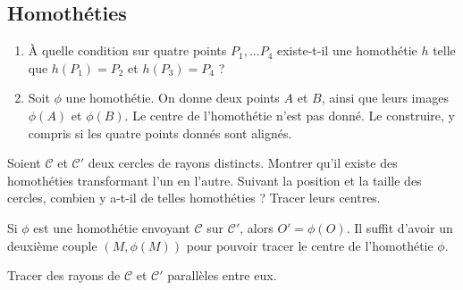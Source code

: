 \subsection{Homothéties}
 
\begin{exo} %
\begin{enumerate}
\item À quelle condition sur quatre points $P_1, ... P_4$ existe-t-il une homothétie $h$ telle que $h(P_1)=P_2$ et $h(P_3)=P_4$ ?
\item Soit $\phi$ une homothétie. On donne deux points $A$ et $B$, ainsi que leurs images $\phi(A)$ et $\phi(B)$. Le centre de l'homothétie n'est pas donné. Le construire, y compris si les quatre points donnés sont alignés.
\end{enumerate}
\end{exo}  


\begin{exo}
Soient $\mathcal C$ et $\mathcal C'$ deux cercles de rayons distincts. Montrer qu'il existe des homothéties transformant l'un en l'autre. Suivant la position et la taille des cercles, combien y a-t-il de telles homothéties ? Tracer leurs centres.

\begin{hint}   
Si $\phi$ est une homothétie envoyant $\mathcal C$ sur $\mathcal C'$, alors $O'=\phi(O)$. Il suffit d'avoir un deuxième couple $(M, \phi(M))$ pour pouvoir tracer le centre de l'homothétie $\phi$.
\end{hint} 
\begin{sol}  
Tracer des rayons de $\mathcal C$ et $\mathcal C'$ parallèles entre eux.
\end{sol}   
\end{exo}  




